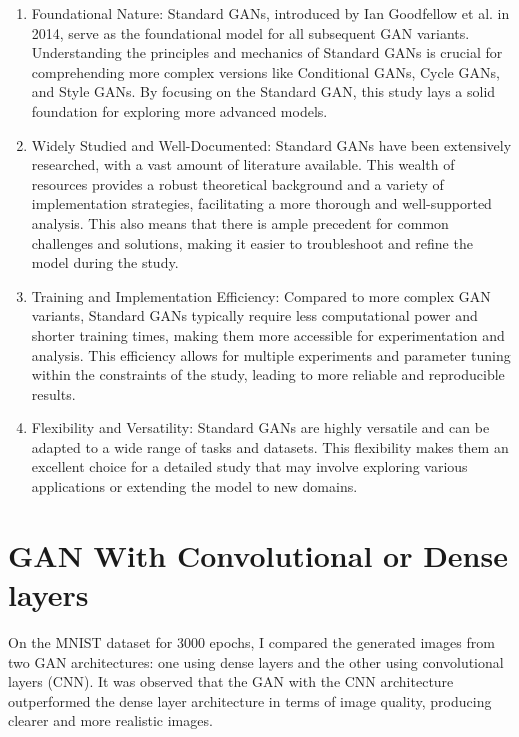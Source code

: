 \begin{enumerate}
    \item Foundational Nature: Standard GANs, introduced by Ian Goodfellow et al. in 2014, serve as the 
    foundational model for all subsequent GAN variants. Understanding the principles and mechanics of 
    Standard GANs is crucial for comprehending more complex versions like Conditional GANs, Cycle GANs, 
    and Style GANs. By focusing on the Standard GAN, this study lays a solid foundation for exploring more advanced models.

    \item Widely Studied and Well-Documented: Standard GANs have been extensively researched, with a 
    vast amount of literature available. This wealth of resources provides a robust theoretical 
    background and a variety of implementation strategies, facilitating a more thorough and 
    well-supported analysis. This also means that there is ample precedent for common challenges 
    and solutions, making it easier to troubleshoot and refine the model during the study.

    \item Training and Implementation Efficiency: Compared to more complex GAN variants, 
    Standard GANs typically require less computational power and shorter training times, 
    making them more accessible for experimentation and analysis. This efficiency allows 
    for multiple experiments and parameter tuning within the constraints of the study, 
    leading to more reliable and reproducible results.

    \item Flexibility and Versatility: Standard GANs are highly versatile and can be adapted 
    to a wide range of tasks and datasets. This flexibility makes them an excellent choice for 
    a detailed study that may involve exploring various applications or extending the model to new domains.
\end{enumerate}



\section{GAN With Convolutional or Dense layers}

On the MNIST dataset for 3000 epochs, I compared the generated images from two GAN architectures: one using dense layers and the other using convolutional layers (CNN). It was observed that the GAN with the CNN architecture outperformed the dense layer architecture in terms of image quality, producing clearer and more realistic images.

